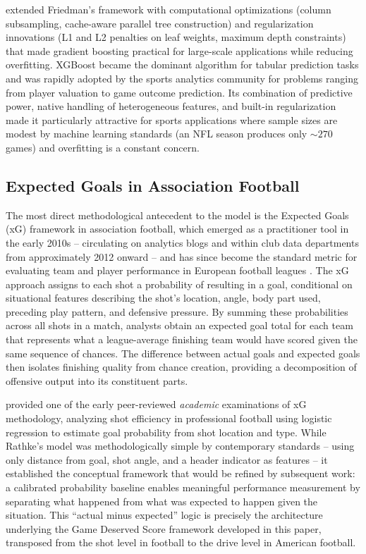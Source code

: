 \textcite{chen2016xgboost} extended Friedman's framework with computational optimizations (column subsampling, cache-aware parallel tree construction) and regularization innovations (L1 and L2 penalties on leaf weights, maximum depth constraints) that made gradient boosting practical for large-scale applications while reducing overfitting. XGBoost became the dominant algorithm for tabular prediction tasks and was rapidly adopted by the sports analytics community for problems ranging from player valuation to game outcome prediction. Its combination of predictive power, native handling of heterogeneous features, and built-in regularization made it particularly attractive for sports applications where sample sizes are modest by machine learning standards (an NFL season produces only ${\sim}270$ games) and overfitting is a constant concern.

\subsection{Expected Goals in Association Football}
\label{sec:xg-literature}

The most direct methodological antecedent to the \xscore{} model is the Expected Goals (xG) framework in association football, which emerged as a practitioner tool in the early 2010s  -- circulating on analytics blogs and within club data departments from approximately 2012 onward  -- and has since become the standard metric for evaluating team and player performance in European football leagues \parencite{eggels2016expected}. The xG approach assigns to each shot a probability of resulting in a goal, conditional on situational features describing the shot's location, angle, body part used, preceding play pattern, and defensive pressure. By summing these probabilities across all shots in a match, analysts obtain an expected goal total for each team that represents what a league-average finishing team would have scored given the same sequence of chances. The difference between actual goals and expected goals then isolates finishing quality from chance creation, providing a decomposition of offensive output into its constituent parts.

\textcite{rathke2017expectedgoals} provided one of the early peer-reviewed \emph{academic} examinations of xG methodology, analyzing shot efficiency in professional football using logistic regression to estimate goal probability from shot location and type. While Rathke's model was methodologically simple by contemporary standards  -- using only distance from goal, shot angle, and a header indicator as features  -- it established the conceptual framework that would be refined by subsequent work: a calibrated probability baseline enables meaningful performance measurement by separating what happened from what was expected to happen given the situation. This ``actual minus expected'' logic is precisely the architecture underlying the Game Deserved Score framework developed in this paper, transposed from the shot level in football to the drive level in American football.

